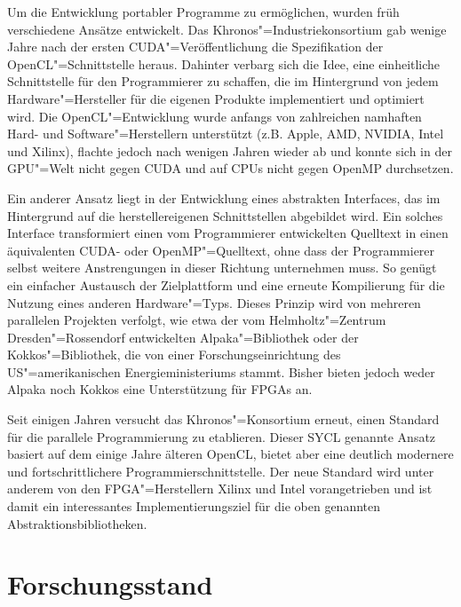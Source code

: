 Um die Entwicklung portabler Programme zu ermöglichen, wurden früh verschiedene
Ansätze entwickelt. Das Khronos"=Industriekonsortium gab wenige Jahre nach der
ersten CUDA"=Veröffentlichung die Spezifikation der OpenCL"=Schnittstelle
heraus. Dahinter verbarg sich die Idee, eine einheitliche Schnittstelle für den
Programmierer zu schaffen, die im Hintergrund von jedem Hardware"=Hersteller für
die eigenen Produkte implementiert und optimiert wird. Die OpenCL"=Entwicklung
wurde anfangs von zahlreichen namhaften Hard- und Software"=Herstellern
unterstützt (z.B. Apple, AMD, NVIDIA, Intel und Xilinx), flachte jedoch nach
wenigen Jahren wieder ab und konnte sich in der GPU"=Welt nicht gegen CUDA
und auf CPUs nicht gegen OpenMP durchsetzen.

Ein anderer Ansatz liegt in der Entwicklung eines abstrakten Interfaces, das im
Hintergrund auf die herstellereigenen Schnittstellen abgebildet wird. Ein solches
Interface transformiert einen vom Programmierer entwickelten Quelltext in einen
äquivalenten CUDA- oder OpenMP"=Quelltext, ohne dass der Programmierer selbst
weitere Anstrengungen in dieser Richtung unternehmen muss. So genügt ein
einfacher Austausch der Zielplattform und eine erneute Kompilierung für die
Nutzung eines anderen Hardware"=Typs. Dieses Prinzip wird von mehreren
parallelen Projekten verfolgt, wie etwa der vom Helmholtz"=Zentrum
Dresden"=Rossendorf entwickelten Alpaka"=Bibliothek oder der Kokkos"=Bibliothek,
die von einer Forschungseinrichtung des US"=amerikanischen Energieministeriums
stammt. Bisher bieten jedoch weder Alpaka noch Kokkos eine Unterstützung für
FPGAs an.

Seit einigen Jahren versucht das Khronos"=Konsortium erneut, einen Standard für
die parallele Programmierung zu etablieren. Dieser SYCL genannte Ansatz basiert
auf dem einige Jahre älteren OpenCL, bietet aber eine deutlich modernere und
fortschrittlichere Programmierschnittstelle. Der neue Standard wird unter
anderem von den FPGA"=Herstellern Xilinx und Intel vorangetrieben und ist damit
ein interessantes Implementierungsziel für die oben genannten
Abstraktionsbibliotheken.

\section{Forschungsstand}\label{einleitung:forschung}

